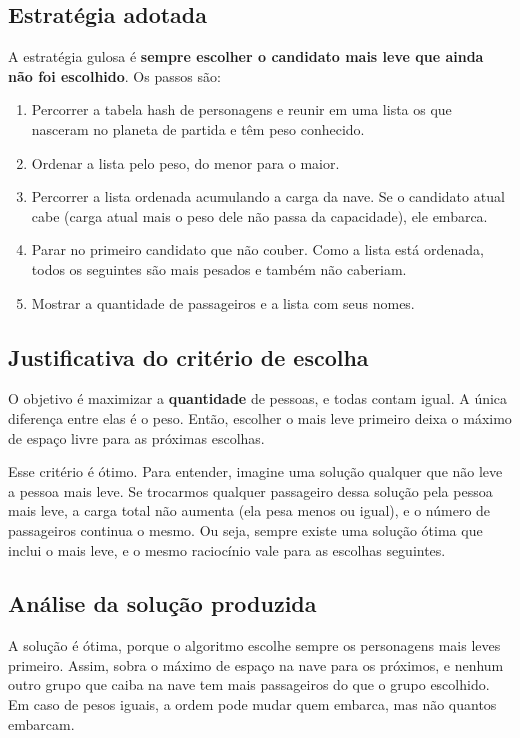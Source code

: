 \documentclass[12pt,a4paper]{article}
\begin{document}
\subsection{Estratégia adotada}
A estratégia gulosa é \textbf{sempre escolher o candidato mais leve que ainda não foi escolhido}. Os passos são:
\begin{enumerate}
    \item Percorrer a tabela hash de personagens e reunir em uma lista os que nasceram no planeta de partida e têm peso conhecido.
    \item Ordenar a lista pelo peso, do menor para o maior.
    \item Percorrer a lista ordenada acumulando a carga da nave. Se o candidato atual cabe (carga atual mais o peso dele não passa da capacidade), ele embarca.
    \item Parar no primeiro candidato que não couber. Como a lista está ordenada, todos os seguintes são mais pesados e também não caberiam.
    \item Mostrar a quantidade de passageiros e a lista com seus nomes.
\end{enumerate}

\subsection{Justificativa do critério de escolha}

O objetivo é maximizar a \textbf{quantidade} de pessoas, e todas contam igual. A única diferença entre elas é o peso. Então, escolher o mais leve primeiro deixa o máximo de espaço livre para as próximas escolhas.

Esse critério é ótimo. Para entender, imagine uma solução qualquer que não leve a pessoa mais leve. Se trocarmos qualquer passageiro dessa solução pela pessoa mais leve, a carga total não aumenta (ela pesa menos ou igual), e o número de passageiros continua o mesmo. Ou seja, sempre existe uma solução ótima que inclui o mais leve, e o mesmo raciocínio vale para as escolhas seguintes.

\subsection{Análise da solução produzida}

A solução é ótima, porque o algoritmo escolhe sempre os personagens mais leves primeiro. Assim, sobra o máximo de espaço na nave para os próximos, e nenhum outro grupo que caiba na nave tem mais passageiros do que o grupo escolhido. Em caso de pesos iguais, a ordem pode mudar quem embarca, mas não quantos embarcam.
\end{document}
